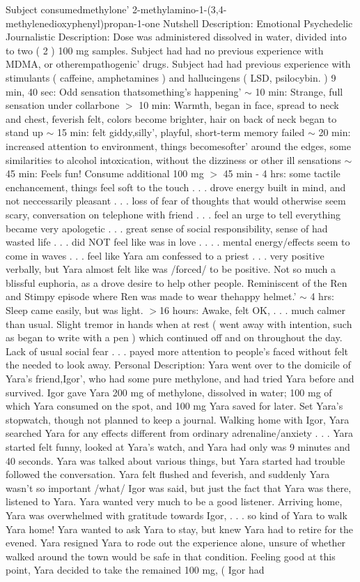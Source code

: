 \documentclass[12pt]{book}
\begin{document}
Subject consumedmethylone' 2-methylamino-1-(3,4-methylenedioxyphenyl)propan-1-one Nutshell Description: Emotional Psychedelic Journalistic Description: Dose was administered dissolved in water, divided into to two ( 2 ) 100 mg samples. Subject had had no previous experience with MDMA, or otherempathogenic' drugs. Subject had had previous experience with stimulants ( caffeine, amphetamines ) and hallucingens ( LSD, psilocybin. ) 9 min, 40 sec: Odd sensation thatsomething's happening' $\sim$ 10 min: Strange, full sensation under collarbone $>$ 10 min: Warmth, began in face, spread to neck and chest, feverish felt, colors become brighter, hair on back of neck began to stand up $\sim$ 15 min: felt giddy,silly', playful, short-term memory failed $\sim$ 20 min: increased attention to environment, things becomesofter' around the edges, some similarities to alcohol intoxication, without the dizziness or other ill sensations $\sim$ 45 min: Feels fun! Consume additional 100 mg $>$ 45 min - 4 hrs: some tactile enchancement, things feel soft to the touch . . .  drove energy built in mind, and not neccessarily pleasant . . .  loss of fear of thoughts that would otherwise seem scary, conversation on telephone with friend . . .  feel an urge to tell everything became very apologetic . . .  great sense of social responsibility, sense of had wasted life . . .  did NOT feel like was in love . . .  . mental energy/effects seem to come in waves . . .  feel like Yara am confessed to a priest . . .  very positive verbally, but Yara almost felt like was /forced/ to be positive. Not so much a blissful euphoria, as a drove desire to help other people. Reminiscent of the Ren and Stimpy episode where Ren was made to wear thehappy helmet.' $\sim$ 4 hrs: Sleep came easily, but was light. $>$16 hours: Awake, felt OK, . . .  much calmer than usual. Slight tremor in hands when at rest ( went away with intention, such as began to write with a pen ) which continued off and on throughout the day. Lack of usual social fear . . .  payed more attention to people's faced without felt the needed to look away. Personal Description: Yara went over to the domicile of Yara's friend,Igor', who had some pure methylone, and had tried Yara before and survived. Igor gave Yara 200 mg of methylone, dissolved in water; 100 mg of which Yara consumed on the spot, and 100 mg Yara saved for later. Set Yara's stopwatch, though not planned to keep a journal. Walking home with Igor, Yara searched Yara for any effects different from ordinary adrenaline/anxiety . . .  Yara started felt funny, looked at Yara's watch, and Yara had only was 9 minutes and 40 seconds. Yara was talked about various things, but Yara started had trouble followed the conversation. Yara felt flushed and feverish, and suddenly Yara wasn't so important /what/ Igor was said, but just the fact that Yara was there, listened to Yara. Yara wanted very much to be a good listener. Arriving home, Yara was overwhelmed with gratitude towards Igor,  . . .  so kind of Yara to walk Yara home! Yara wanted to ask Yara to stay, but knew Yara had to retire for the evened. Yara resigned Yara to rode out the experience alone, unsure of whether walked around the town would be safe in that condition. Feeling good at this point, Yara decided to take the remained 100 mg, ( Igor had 
\end{document}

